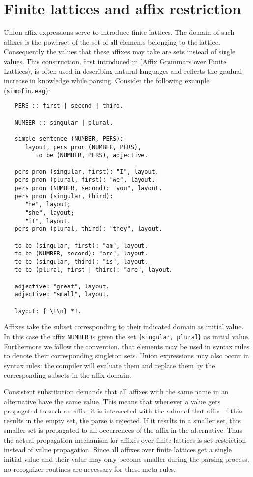 \section {Finite lattices and affix restriction}
Union affix expressions serve to introduce finite lattices. The domain
of such affixes is the powerset of the set of all elements belonging
to the lattice. Consequently the values that these affixes may take
are sets instead of single values. This construction, first introduced
in \AGFL (Affix Grammars over Finite Lattices), is often used in
describing natural languages and reflects the gradual increase in
knowledge while parsing. Consider the following example ({\tt simpfin.eag}):
\begin{verbatim}
   PERS :: first | second | third.

   NUMBER :: singular | plural.

   simple sentence (NUMBER, PERS):
      layout, pers pron (NUMBER, PERS),
         to be (NUMBER, PERS), adjective.

   pers pron (singular, first): "I", layout.
   pers pron (plural, first): "we", layout.
   pers pron (NUMBER, second): "you", layout.
   pers pron (singular, third):
      "he", layout;
      "she", layout;
      "it", layout.
   pers pron (plural, third): "they", layout.

   to be (singular, first): "am", layout.
   to be (NUMBER, second): "are", layout.
   to be (singular, third): "is", layout.
   to be (plural, first | third): "are", layout.

   adjective: "great", layout.
   adjective: "small", layout.

   layout: { \t\n} *!.
\end{verbatim}
Affixes take the subset corresponding to their indicated domain as
initial value. In this case the affix \verb+NUMBER+ is given the
set \verb+{singular, plural}+ as initial value. Furthermore we
follow the \AGFL convention, that elements may be used in syntax
rules to denote their corresponding singleton sets. Union expressions
may also occur in syntax rules: the \EAG compiler will evaluate them
and replace them by the corresponding subsets in the affix domain.

Consistent substitution demands that all affixes with the same name
in an alternative have the same value. This means that whenever a
value gets propagated to such an affix, it is intersected with the
value of that affix. If this results in the empty set, the parse is
rejected. If it results in a smaller set, this smaller set is propagated
to all occurrences of the affix in the alternative. Thus the actual
propagation mechanism for affixes over finite lattices is set restriction
instead of value propagation. Since all affixes over finite lattices get
a single initial value and their value may only become smaller during
the parsing process, no recognizer routines are necessary for these
meta rules.

